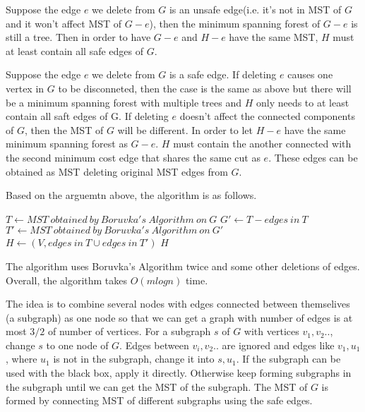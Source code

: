 \documentclass[12pt,a4paper]{article}
\newcommand{\question}[1]{\bigskip\noindent{\textbf{Q{#1} solution}}}
\begin{document}
Suppose the edge $e$ we delete from $G$ is an unsafe edge(i.e. it's not in MST of $G$ and it won't affect MST of $G-e$), then the minimum spanning forest of $G-e$ is still a tree. Then in order to have $G-e$ and $H-e$ have the same MST, $H$ must at least contain all safe edges of $G$.

Suppose the edge $e$ we delete from $G$ is a safe edge. If deleting $e$ causes one vertex in $G$ to be disconneted, then the case is the same as above but there will be a minimum spanning forest with multiple trees and $H$ only needs to at least contain all saft edges of G. If deleting $e$ doesn't affect the connected components of $G$, then the MST of $G$ will be different. In order to let $H - e$ have the same minimum spanning forest as $G - e$. $H$ must contain the another connected with the second minimum cost edge that shares the same cut as $e$. These edges can be obtained as MST deleting original MST edges from $G$.

Based on the arguemtn above, the algorithm is as follows.

\begin{algorithm}
  \begin{algorithmic}
    \State $T \gets MST\ obtained\ by\ Boruvka's\ Algorithm\ on\ G$
    \State $G' \gets T - edges\ in\ T$
    \State $T' \gets MST\ obtained\ by\ Boruvka's\ Algorithm\ on\ G'$
    \State $H \gets (V,edges\ in\ T \cup edges\ in\ T')$
    \State \Return $H$
    \EndFunction
  \end{algorithmic}
\end{algorithm}

The algorithm uses Boruvka's Algorithm twice and some other deletions of edges. Overall, the algorithm takes $O(mlogn)$ time.

\question{29.B}

The idea is to combine several nodes with edges connected between themselives (a subgraph) as one node so that we can get a graph with number of edges is at most $3/2$ of number of vertices. For a subgraph $s$ of $G$ with vertices $v_1,v_2..$, change $s$ to one node of $G$. Edges between $v_i,v_2..$ are ignored and edges like ${v_1,u_1}$, where $u_1$ is not in the subgraph, change it into ${s,u_1}$. If the subgraph can be used with the black box, apply it directly. Otherwise keep forming subgraphs in the subgraph until we can get the MST of the subgraph. The MST of $G$ is formed by connecting MST of different subgraphs using the safe edges. 
\end{document}
